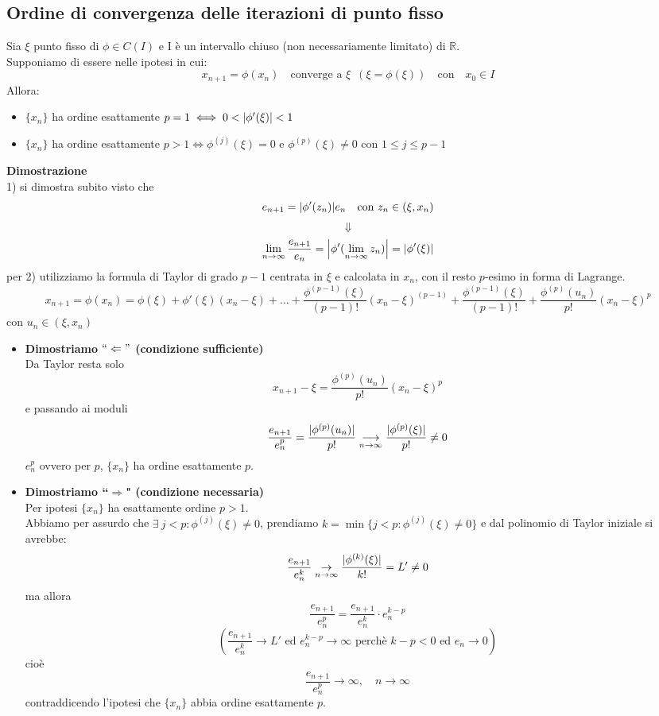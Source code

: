 \subsection{Ordine di convergenza delle iterazioni di punto fisso}
Sia $\xi$ punto fisso di $\phi \in C(I)$  e I è un intervallo chiuso (non necessariamente limitato) di $\mathbb{R}$.\\ 
Supponiamo di essere nelle ipotesi in cui:
\begin{equation*}
x_{n+1} = \phi(x_n) \quad \text{converge a } \xi \,\,\,(\xi=\phi(\xi)) \quad \text{con} \quad x_0\in I
\end{equation*}
Allora:
\begin{itemize}
	\item $\{x_n\}$ ha ordine esattamente $p=1 \iff 0<\abs*{\phi'(\xi)}<1$ 
	\item $\{x_n\}$ ha ordine esattamente $p>1 \iff \phi^{(j)}(\xi)=0$ e $\phi^{(p)}(\xi)\ne0$ con $1\le j\le p-1$ 
\end{itemize}
\textbf{Dimostrazione}\\
1) si dimostra subito visto che
\[e_{n+1}={\abs*{\phi'(z_n)}}e_n \quad \text{con} \,\, z_n\in(\xi,x_n)\]
\[\Downarrow\]
\[\lim_{n \to \infty} \frac{e_{n+1}}{e_n} = \abs*{\phi'(\lim_{n \to \infty }z_n)} = \abs*{\phi'(\xi)}\]
per 2) utilizziamo la formula di Taylor di grado $p-1$ centrata in $\xi$ e calcolata in $x_n$, con il resto $p$-esimo in forma di Lagrange.
\[
x_{n+1}=\phi(x_n)=\phi(\xi)+\phi'(\xi)(x_n-\xi)+\dots+\frac{\phi^{(p-1)}(\xi)}{(p-1)!}(x_n-\xi)^{(p-1)}+\frac{\phi^{(p-1)}(\xi)}{(p-1)!}+\frac{\phi^{(p)}(u_n)}{p!}(x_n-\xi)^p
\]
con $u_n \in (\xi,x_n)$\\
\begin{itemize}
	\item \textbf{Dimostriamo $``\Leftarrow"$ (condizione sufficiente)}\\
	Da Taylor resta solo
	\[x_{n+1}-\xi=\frac{\phi^{(p)}(u_n)}{p!}(x_n-\xi)^p\]
	e passando ai moduli
	\[\frac{e_{n+1}}{e_n^p}=\frac{\abs{\phi^{(p)}(u_n)}}{p!}\underset{n\to\infty}{\longrightarrow}\frac{\abs{\phi^{(p)}(\xi)}}{p!}\neq 0\]
	$e_n^p$ ovvero per $p$, $\{x_n\}$ ha ordine esattamente $p$. \\
	\item \textbf{Dimostriamo ``$\Rightarrow$" (condizione necessaria)}\\ 
	Per ipotesi $\{ x_n \}$ ha esattamente ordine $p>1$.\\
	Abbiamo per assurdo che $\exists\ j<p :\phi^{(j)}(\xi)\neq 0 $, prendiamo $k=\min\{ j<p:\phi^{(j)}(\xi)\neq0\}$ e dal polinomio di Taylor iniziale si avrebbe:
	\[\frac{e_{n+1}}{e_n^k}\underset{n\to \infty}{\to} \frac{\abs{\phi^{(k)}(\xi)}}{k!}=L'\neq 0\] 
	ma allora
	\[\frac{e_{n+1}}{e_n^p} = \frac{e_{n+1}}{e_n^k}\cdot e_n^{k-p}\]
	\[\left( \frac{e_{n+1}}{e_n^k} \to L' \text{ ed } e_n^{k-p} \to \infty \text{ perchè } k-p<0 \text{ ed } e_n \to 0 \right) \]
	cioè 
	\[\frac{e_{n+1}}{e_n^p} \to \infty, \quad n \to \infty\]
	contraddicendo l'ipotesi che $\{x_n\}$ abbia ordine esattamente $p$.
\end{itemize}
